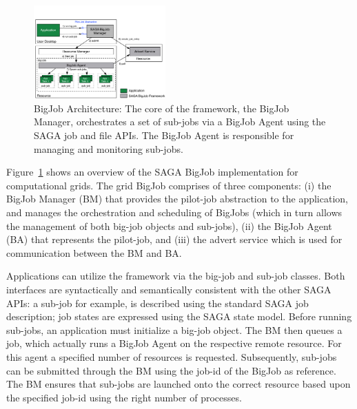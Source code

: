 \documentclass[conference,final]{IEEEtran}
\newcommand{\up}{\vspace*{-1em}}
\newcommand{\alnote}[1]{ {\textcolor{blue} { ***AL: #1 }}}
\newcommand{\jhanote}[1]{ {\textcolor{red} { ***SJ: #1 }}}
\newcommand{\alnote}[1]{}
\newcommand{\jhanote}[1]{}
\begin{document}
\begin{figure}[ht]
    \centering
    \includegraphics[width=0.45\textwidth]{figures/bigjob}
   \caption{BigJob Architecture: The core of the framework, the
      BigJob Manager, orchestrates a set of sub-jobs via a
      BigJob Agent using the SAGA job and file APIs.  The
      BigJob Agent is responsible for managing and monitoring sub-jobs.\up}
   \label{fig:figures_bigjob}   
\end{figure}

Figure~\ref{fig:figures_bigjob} shows an overview of the SAGA BigJob
implementation for computational grids. The grid BigJob comprises of
three components: (i) the BigJob Manager (BM) that provides the
pilot-job abstraction to the application, and manages the
orchestration and scheduling of BigJobs (which in turn allows the
management of both big-job objects and sub-jobs), (ii) the BigJob
Agent (BA) that represents the pilot-job, and (iii) the advert service
which is used for communication between the BM and BA.

Applications can utilize the framework via the big-job and sub-job
classes. Both interfaces are syntactically and semantically consistent
with the other SAGA APIs: a sub-job for example, is described using
the standard SAGA job description; job states are expressed using the
SAGA state model. Before running sub-jobs, an application must
initialize a big-job object. The BM then queues a job, which actually
runs a BigJob Agent on the respective remote resource. For this agent
a specified number of resources is requested. Subsequently, sub-jobs
can be submitted through the BM using the job-id of the BigJob as
reference. The BM ensures that sub-jobs are launched onto the correct
resource based upon the specified job-id using the right number of
processes.

\end{document}
